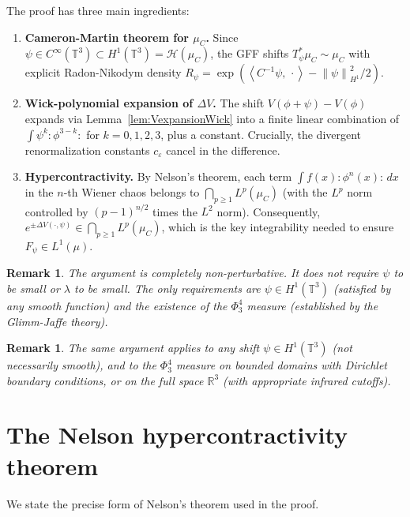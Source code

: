 \documentclass[12pt]{article}
\newtheorem{remark}[theorem]{Remark}
\newcommand{\T}{\mathbb{T}}
\newcommand{\R}{\mathbb{R}}
\newcommand{\Hc}{\mathcal{H}}
\newcommand{\norm}[1]{\left\|#1\right\|}
\newcommand{\ip}[2]{\left\langle #1,\, #2 \right\rangle}
\newcommand{\wick}[1]{:\!#1\!:}
\begin{document}
The proof has three main ingredients:

\begin{enumerate}
  \item \textbf{Cameron-Martin theorem for $\mu_C$.}  Since $\psi\in C^\infty(\T^3)\subset H^1(\T^3)
        = \Hc(\mu_C)$, the GFF shifts $T_\psi^*\mu_C\sim\mu_C$ with explicit Radon-Nikodym
        density $R_\psi = \exp(\ip{C^{-1}\psi}{\cdot}-\norm\psi_{H^1}^2/2)$.

  \item \textbf{Wick-polynomial expansion of $\Delta V$.}  The shift $V(\phi+\psi)-V(\phi)$
        expands via Lemma~\ref{lem:VexpansionWick} into a finite linear combination of
        $\int\psi^k\wick{\phi^{3-k}}$ for $k=0,1,2,3$, plus a constant.  Crucially, the
        divergent renormalization constants $c_\varepsilon$ cancel in the difference.

  \item \textbf{Hypercontractivity.}  By Nelson's theorem, each term $\int f(x)\wick{\phi^n(x)}\,dx$
        in the $n$-th Wiener chaos belongs to $\bigcap_{p\ge 1}L^p(\mu_C)$ (with the $L^p$
        norm controlled by $(p-1)^{n/2}$ times the $L^2$ norm).  Consequently,
        $e^{\pm\Delta V(\cdot,\psi)}\in\bigcap_{p\ge 1}L^p(\mu_C)$, which is the key
        integrability needed to ensure $F_\psi\in L^1(\mu)$.
\end{enumerate}

\begin{remark}
The argument is completely non-perturbative.  It does not require $\psi$ to be small or
$\lambda$ to be small.  The only requirements are $\psi\in H^1(\T^3)$ (satisfied by any
smooth function) and the existence of the $\Phi^4_3$ measure (established by the
Glimm-Jaffe theory).
\end{remark}

\begin{remark}
The same argument applies to any shift $\psi\in H^1(\T^3)$ (not necessarily smooth),
and to the $\Phi^4_3$ measure on bounded domains with Dirichlet boundary conditions, or on
the full space $\R^3$ (with appropriate infrared cutoffs).
\end{remark}

\appendix

\section{The Nelson hypercontractivity theorem}

We state the precise form of Nelson's theorem used in the proof.
\end{document}
